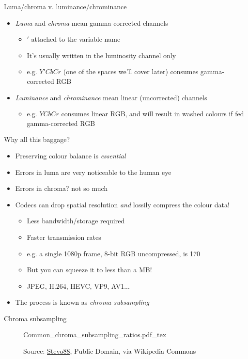 \documentclass[aspectratio=169,usepdftitle=false]{fireshonks}
\begin{document}
\begin{frame}{Luma/chroma v. luminance/chrominance}
    \begin{itemize}
        \item \emph{Luma} and \emph{chroma} mean gamma-corrected channels
              \begin{itemize}
                  \item $'$ attached to the variable name
                  \item It's usually written in the luminosity channel only
                  \item e.g. $Y'CbCr$ (one of the spaces we'll cover later) consumes gamma-corrected RGB
              \end{itemize}
        \item \emph{Luminance} and \emph{chrominance} mean linear (uncorrected) channels
              \begin{itemize}
                  \item e.g. $YCbCr$ consumes linear RGB, and will result in washed colours if fed gamma-corrected RGB
              \end{itemize}
    \end{itemize}
\end{frame}
\begin{frame}{Why all this baggage?}
    \begin{itemize}
        \item Preserving colour balance is \emph{essential}
        \item Errors in luma are very noticeable to the human eye
        \item Errors in chroma? not so much
        \item Codecs can drop spatial resolution \emph{and} lossily compress the colour data!
              \begin{itemize}
                  \item Less bandwidth/storage required
                  \item Faster transmission rates
                  \item e.g. a single 1080p frame, 8-bit RGB uncompressed, is \SI{170}{\mega\byte}
                  \item But you can squeeze it to less than a MB!
                  \item JPEG, H.264, HEVC, VP9, AV1... 
              \end{itemize}
        \item The process is known as \emph{chroma subsampling}
    \end{itemize}
\end{frame}
\begin{frame}{Chroma subsampling}
    \begin{figure}
        \centering
        \def\svgwidth{.6\textwidth}
        {Common_chroma_subsampling_ratios.pdf_tex}
        \caption*{Source: \href{https://commons.wikimedia.org/wiki/File:Common_chroma_subsampling_ratios.svg}{Stevo88}, Public Domain, via Wikipedia Commons}
    \end{figure}
\end{frame}
\end{document}
